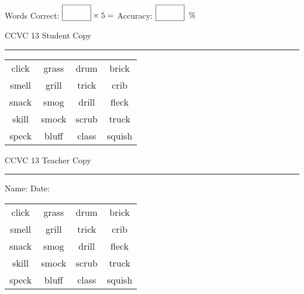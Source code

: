 \documentclass{memoir}
\begin{document}
\small

Words Correct: $\fbox{\phantom{\huge 100}} \times 5 = $ Accuracy: $\fbox{\phantom{\huge 100}}\;\; \%$ 

\vfill

\newpage


\footnotesize \noindent
CCVC 13 \hfill Student Copy
\smallskip
\hrule

\Large

\setlength{\tabcolsep}{14pt}
\def\arraystretch{3}

{\selectfont


\begin{vplace}[0.5]
\begin{center}
\begin{tabular}{cccc}
click             & grass                    & drum & brick       \\
smell & grill            & trick & crib \\
snack & smog & drill & fleck             \\
skill & smock & scrub & truck \\
speck & bluff & class             & squish \\
\end{tabular}
\end{center}
\end{vplace}

}

\newpage

\footnotesize \noindent
CCVC 13 \hfill Teacher Copy
\smallskip
\hrule

\small

\vfill

\noindent
Name: \underline{\hspace{1.75in}} \hfill Date: \underline{\hspace{1in}}

\Large

{\selectfont


\begin{vplace}[0.5]
\begin{center}
\begin{tabular}{cccc}
click             & grass                    & drum & brick       \\
smell & grill            & trick & crib \\
snack & smog & drill & fleck             \\
skill & smock & scrub & truck \\
speck & bluff & class             & squish \\
\end{tabular}
\end{center}
\end{vplace}



}
\end{document}
